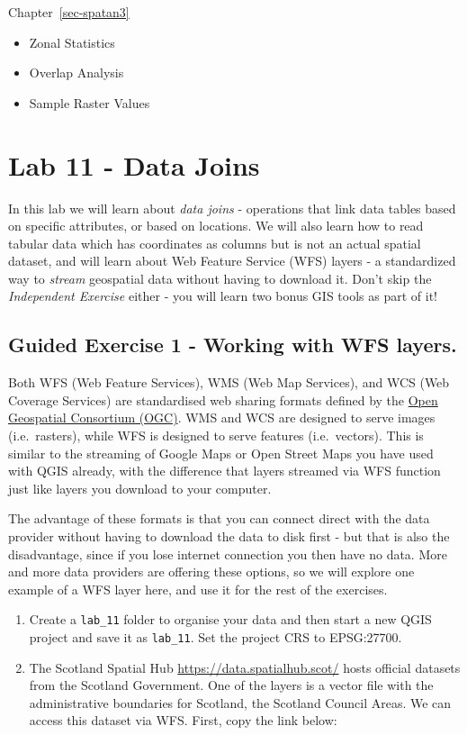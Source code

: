 \documentclass[
  letterpaper,
  DIV=11,
  numbers=noendperiod]{scrreprt}
\providecommand{\tightlist}{%
  \setlength{\itemsep}{0pt}\setlength{\parskip}{0pt}}\usepackage{longtable,booktabs,array}
\begin{document}
Chapter~\ref{sec-spatan3}

\begin{itemize}
\tightlist
\item
  Zonal Statistics
\item
  Overlap Analysis
\item
  Sample Raster Values
\end{itemize}

\chapter{Lab 11 - Data Joins}\label{sec-spatan2}

In this lab we will learn about \emph{data joins} - operations that link
data tables based on specific attributes, or based on locations. We will
also learn how to read tabular data which has coordinates as columns but
is not an actual spatial dataset, and will learn about Web Feature
Service (WFS) layers - a standardized way to \emph{stream} geospatial
data without having to download it. Don't skip the \emph{Independent
Exercise} either - you will learn two bonus GIS tools as part of it!

\section{Guided Exercise 1 - Working with WFS
layers.}\label{guided-exercise-1---working-with-wfs-layers.}

Both WFS (Web Feature Services), WMS (Web Map Services), and WCS (Web
Coverage Services) are standardised web sharing formats defined by the
\href{https://www.ogc.org/}{Open Geospatial Consortium (OGC)}. WMS and
WCS are designed to serve images (i.e.~rasters), while WFS is designed
to serve features (i.e.~vectors). This is similar to the streaming of
Google Maps or Open Street Maps you have used with QGIS already, with
the difference that layers streamed via WFS function just like layers
you download to your computer.

The advantage of these formats is that you can connect direct with the
data provider without having to download the data to disk first - but
that is also the disadvantage, since if you lose internet connection you
then have no data. More and more data providers are offering these
options, so we will explore one example of a WFS layer here, and use it
for the rest of the exercises.

\begin{enumerate}
\def\labelenumi{(\arabic{enumi})}
\setcounter{enumi}{306}
\item
  Create a \texttt{lab\_11} folder to organise your data and then start
  a new QGIS project and save it as \texttt{lab\_11}. Set the project
  CRS to EPSG:27700.
\item
  The Scotland Spatial Hub \url{https://data.spatialhub.scot/} hosts
  official datasets from the Scotland Government. One of the layers is a
  vector file with the administrative boundaries for Scotland, the
  Scotland Council Areas. We can access this dataset via WFS. First,
  copy the link below:
\end{enumerate}
\end{document}
